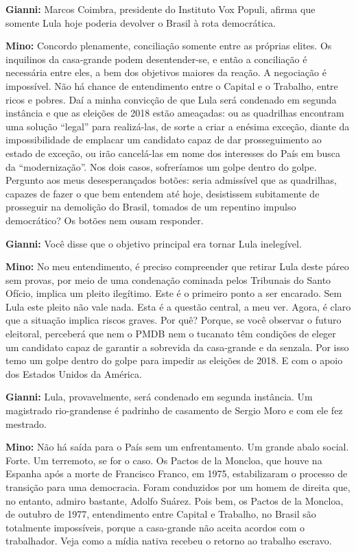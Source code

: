 \textbf{Gianni:} Marcos Coimbra, presidente do Instituto Vox Populi,
afirma que somente Lula hoje poderia devolver o Brasil à rota
democrática.

\textbf{Mino:} Concordo plenamente, conciliação somente entre as
próprias elites. Os inquilinos da casa-grande podem desentender-se, e
então a conciliação é necessária entre eles, a bem dos objetivos maiores
da reação. A negociação é impossível. Não há chance de entendimento
entre o Capital e o Trabalho, entre ricos e pobres. Daí a minha
convicção de que Lula será condenado em segunda instância e que as
eleições de 2018 estão ameaçadas: ou as quadrilhas encontram uma solução
``legal'' para realizá-las, de sorte a criar a enésima exceção, diante
da impossibilidade de emplacar um candidato capaz de dar prosseguimento
ao estado de exceção, ou irão cancelá-las em nome dos interesses do País
em busca da ``modernização''. Nos dois casos, sofreríamos um golpe
dentro do golpe. Pergunto aos meus desesperançados botões: seria
admissível que as quadrilhas, capazes de fazer o que bem entendem até
hoje, desistissem subitamente de prosseguir na demolição do Brasil,
tomados de um repentino impulso democrático? Os botões nem ousam
responder.

\textbf{Gianni:} Você disse que o objetivo principal era tornar Lula
inelegível.

\textbf{Mino:} No meu entendimento, é preciso compreender que retirar
Lula deste páreo sem provas, por meio de uma condenação cominada pelos
Tribunais do Santo Ofício, implica um pleito ilegítimo. Este é o
primeiro ponto a ser encarado. Sem Lula este pleito não vale nada. Esta
é a questão central, a meu ver. Agora, é claro que a situação implica
riscos graves. Por quê? Porque, se você observar o futuro eleitoral,
perceberá que nem o PMDB nem o tucanato têm condições de eleger um
candidato capaz de garantir a sobrevida da casa-grande e da senzala. Por
isso temo um golpe dentro do golpe para impedir as eleições de 2018. E
com o apoio dos Estados Unidos da América.

\textbf{Gianni:} Lula, provavelmente, será condenado em segunda
instância. Um magistrado rio-grandense é padrinho de casamento de Sergio
Moro e com ele fez mestrado.

\textbf{Mino:} Não há saída para o País sem um enfrentamento. Um grande
abalo social. Forte. Um terremoto, se for o caso. Os Pactos de la
Moncloa, que houve na Espanha após a morte de Francisco Franco, em 1975,
estabilizaram o processo de transição para uma democracia. Foram
conduzidos por um homem de direita que, no entanto, admiro bastante,
Adolfo Suárez. Pois bem, os Pactos de la Moncloa, de outubro de 1977,
entendimento entre Capital e Trabalho, no Brasil são totalmente
impossíveis, porque a casa-grande não aceita acordos com o trabalhador.
Veja como a mídia nativa recebeu o retorno ao trabalho escravo.

